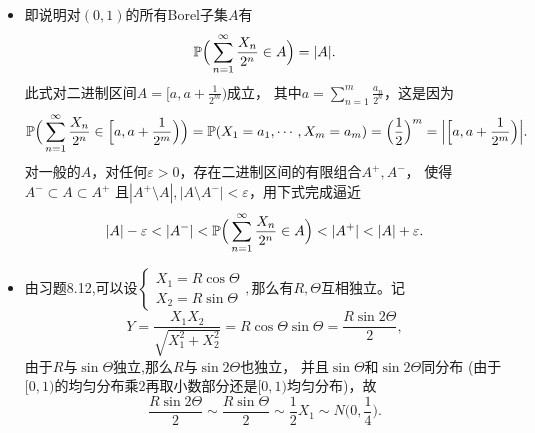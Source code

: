 \begin{itemize}
    \item[9.7]
    即说明对$(0,1)$的所有Borel子集$A$有
    \[\mathbb{P}\Big(\sum_{n=1}^\infty\frac{X_n}{2^n}\in A\Big)=|A|.\]
    此式对二进制区间$A=\big[a,a+\frac{1}{2^m}\big)$成立，
    其中$\displaystyle a=\sum\limits_{n=1}^m\frac{a_n}{2^n}$，这是因为
    \[\mathbb{P}\Big(\sum_{n=1}^\infty\frac{X_n}{2^n}\in\Big[a,a+\frac{1}{2^m}\Big)\Big)
    =\mathbb{P}(X_1=a_1,\cdots,X_m=a_m)=\Big(\frac12\Big)^m
    =\Big|\Big[a,a+\frac{1}{2^m}\Big)\Big|.\]
    对一般的$A$，对任何$\varepsilon>0$，存在二进制区间的有限组合$A^+,A^-$，
    使得$A^-\subset A\subset A^+$
    且$|A^+\setminus A|,|A\setminus A^-|<\varepsilon$，用下式完成逼近
    \[|A|-\varepsilon<|A^-|<\p\Big(\sum_{n=1}^\infty\frac{X_n}{2^n}\in A\Big)
    <|A^+|<|A|+\varepsilon.\]


    \item[9.11]
    由习题8.12,可以设$\begin{cases}
        X_1 = R \cos \Theta \\
        X_2 = R \sin \Theta 
    \end{cases},$那么有$R, \Theta$互相独立。记
    \[Y = \frac{X_1 X_2}{\sqrt{X_1^2 + X_2^2}} 
    = R \cos \Theta \sin\Theta = \frac{R\sin2\Theta}{2},\]
    由于$R$与$\sin\Theta$独立,那么$R$与$\sin 2\Theta$也独立，
    并且$\sin \Theta$和$\sin 2 \Theta$同分布
    (由于$[0,1)$的均匀分布乘$2$再取小数部分还是$[0,1)$均匀分布)，故
    $$\frac{R\sin 2 \Theta}{2}\sim \frac{R \sin\Theta}{2} \sim \frac12X_1 \sim N\Big(0,\frac{1}{4}\Big).$$


\end{itemize}
